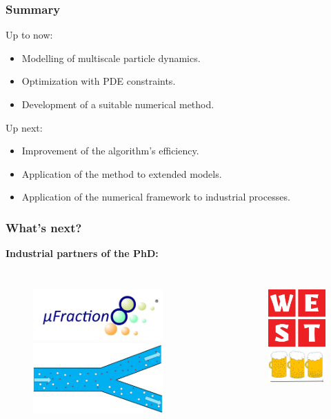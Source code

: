 \documentclass[aspectratio=169,xcolor=dvipsnames]{beamer}
\begin{document}
\begin{frame}
	\frametitle{Summary}
Up to now:
 \begin{itemize}
 	\item Modelling of multiscale particle dynamics.
 	\item Optimization with PDE constraints.
 	\item Development of a suitable numerical method.
 \end{itemize}
Up next:
\begin{itemize}
	\item Improvement of the algorithm's efficiency.
	\item Application of the method to extended models.
 	\item Application of the numerical framework to industrial processes.
 \end{itemize}
	
\end{frame}
\begin{frame}
	\frametitle{What's next?}
	\textbf{Industrial partners of the PhD:}
	\begin{columns}
		\begin{figure}
			\includegraphics[width=5cm]{ufraction8.png}
			\includegraphics[width=5cm]{Microfilter.png}
		\end{figure}
		
		\begin{figure}
			\includegraphics[width=3cm]{west.png}\\
			\includegraphics[width=3.5cm]{beer.png}
		\end{figure}
	\end{columns}
\end{frame}
\end{document}
